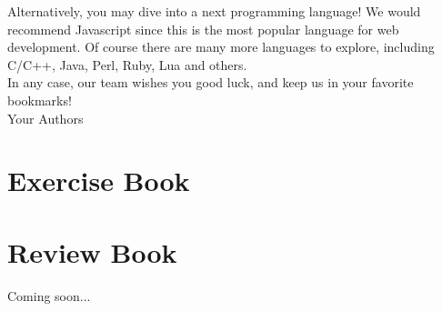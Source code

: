 \documentclass[article,A4,12pt]{llncs}
\begin{document}
Alternatively, you may dive into a next programming language! We would 
recommend Javascript since this is the most popular language for web 
development. Of course there are many more languages to explore, including 
C/C++, Java, Perl, Ruby, Lua and others.\\

\noindent
In any case, our team wishes you good luck, and keep us in your 
favorite bookmarks! \\

\hbox{} \hfill{} Your Authors



\part{Exercise Book}

\setcounter{section}{0}




\part{Review Book}

Coming soon...

%
\end{document}
